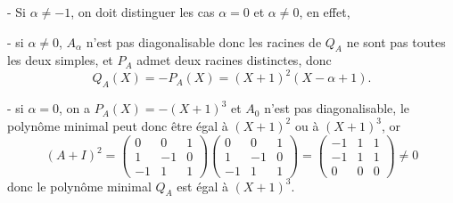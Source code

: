 {\begin{enumerate}
{- Si $\alpha\neq -1$, on doit distinguer les cas $\alpha=0$ et $\alpha\neq0$, en effet, 

\indent - si $\alpha\neq 0$,  $A_\alpha$ n'est pas diagonalisable donc les racines de $Q_A$ ne sont pas toutes les deux simples, et $P_A$ admet deux racines distinctes, donc
$$Q_A(X)=-P_A(X)=(X+1)^2(X-\alpha+1).$$

\indent- si $\alpha=0$, on a $P_A(X)=-(X+1)^3$ et $A_0$ n'est pas diagonalisable, le polyn\^ome minimal peut donc \^etre \'egal \`a $(X+1)^2$ ou \`a $(X+1)^3$, or
$$(A+I)^2=\begin{pmatrix}0 & 0 & 1 \\  1&-1&0 \\ -1&1&1\end{pmatrix}\begin{pmatrix}0 & 0 & 1 \\  1&-1&0 \\ -1&1&1\end{pmatrix}=\begin{pmatrix}-1 & 1 & 1 \\  -1&1&1 \\ 0&0&0\end{pmatrix}\neq0$$
donc le polyn\^ome minimal $Q_A$ est \'egal \`a $(X+1)^3$.}
\end{enumerate}
}
